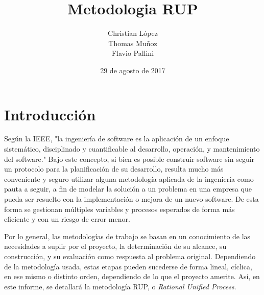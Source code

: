 \documentclass[spanish]{udpreport}
\title{Metodologia RUP}
\author{Christian López \\ Thomas Muñoz \\ Flavio Pallini}
\date{29 de agosto de 2017}
\begin{document}
\maketitle

\tableofcontents
\listoffigures

\chapter{Introducción}
Según la IEEE, "la ingeniería de software es la aplicación de un enfoque sistemático, disciplinado y cuantificable al desarrollo, operación, y mantenimiento del software." Bajo este concepto, si bien es posible construir software sin seguir un protocolo para la planificación de su desarrollo, resulta mucho más conveniente y seguro utilizar alguna metodología aplicada de la ingeniería como pauta a seguir, a fin de modelar la solución a un problema en una empresa que pueda ser resuelto con la implementación o mejora de un nuevo software. De esta forma se gestionan múltiples variables y procesos esperados de forma más eficiente y con un riesgo de error menor. \par
Por lo general, las metodologías de trabajo se basan en un conocimiento de las necesidades a suplir por el proyecto, la determinación de su alcance, su construcción, y su evaluación como respuesta al problema original. Dependiendo de la metodología usada, estas etapas pueden sucederse de forma lineal, cíclica, en ese mismo o distinto orden, dependiendo de lo que el proyecto amerite. Así, en este informe, se detallará la metodología RUP, o \textit{Rational Unified Process}.
\end{document}
